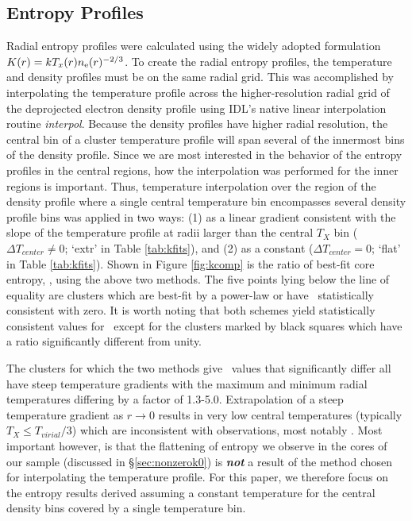 \documentclass[12pt,preprint]{aastex}
\begin{document}
\subsection{Entropy Profiles}
\label{sec:kpr}

Radial entropy profiles were calculated using the widely adopted
formulation $K(r) = kT_x(r)n_{\mathrm{e}}(r)^{-2/3}$. To create the radial
entropy profiles, the temperature and density profiles must be on the
same radial grid. This was accomplished by interpolating the
temperature profile across the higher-resolution radial grid of the
deprojected electron density profile using IDL's native linear
interpolation routine {\it{interpol}}. Because the density profiles
have higher radial resolution, the central bin of a cluster
temperature profile will span several of the innermost bins of the
density profile. Since we are most interested in the behavior of the
entropy profiles in the central regions, how the interpolation was
performed for the inner regions is important. Thus, temperature
interpolation over the region of the density profile where a single
central temperature bin encompasses several density profile bins was
applied in two ways: (1) as a linear gradient consistent with the
slope of the temperature profile at radii larger than the central
$T_X$ bin ($\Delta T_{center} \ne 0$; `extr' in Table
\ref{tab:kfits}), and (2) as a constant ($\Delta T_{center}=0$; `flat'
in Table \ref{tab:kfits}). Shown in Figure \ref{fig:kcomp} is the
ratio of best-fit core entropy, \kna, using the above two methods. The
five points lying below the line of equality are clusters which are
best-fit by a power-law or have \kna\ statistically consistent with
zero. It is worth noting that both schemes yield statistically
consistent values for \kna\ except for the clusters marked by black
squares which have a ratio significantly different from unity.

The clusters for which the two methods give \kna\ values that
significantly differ all have steep temperature gradients with the
maximum and minimum radial temperatures differing by a factor of
1.3-5.0. Extrapolation of a steep temperature gradient as $r
\rightarrow 0$ results in very low central temperatures (typically
$T_X \leq T_{virial}/3$) which are inconsistent with observations,
most notably \citet{peterson03}. Most important however, is that the
flattening of entropy we observe in the cores of our sample (discussed
in \S\ref{sec:nonzerok0}) is {\bfseries\em{not}} a result of the
method chosen for interpolating the temperature profile. For this
paper, we therefore focus on the entropy results derived assuming a
constant temperature for the central density bins covered by a single
temperature bin.
\end{document}
